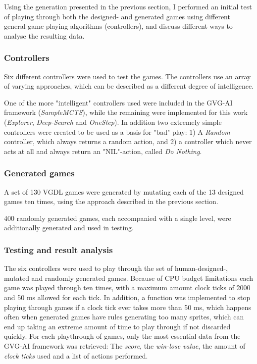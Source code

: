 \documentclass[a4paper,titlepage,final]{report}
\begin{document}
Using the generation presented in the previous section, I performed an initial test of playing through both the designed- and generated games using different general game playing algorithms (controllers), and discuss different ways to analyse the resulting data.


\subsubsection*{Controllers}
Six different controllers were used to test the games. 
The controllers use an array of varying approaches, which can be described as a different degree of intelligence. 

One of the more "intelligent" controllers used were included in the GVG-AI framework (\textit{SampleMCTS}), while the remaining were implemented for this work (\textit{Explorer}, \textit{Deep-Search} and \textit{OneStep}).
In addition two extremely simple controllers were created to be used as a basis for "bad" play:
1) A \textit{Random} controller, which always returns a random action, and 2) a controller which never acts at all and always return an "NIL"-action, called \textit{Do Nothing}.



\subsubsection*{Generated games}
A set of 130 VGDL games were generated by mutating each of the 13 designed games ten times, using the approach described in the previous section.

400 randomly generated games, each accompanied with a single level, were additionally generated and used in testing.

\subsubsection*{Testing and result analysis}
The six controllers were used to play through the set of human-designed-, mutated and randomly generated games. 
Because of CPU budget limitations each game was played through ten times, with a maximum amount clock ticks of 2000 and 50 ms allowed for each tick.
In addition, a function was implemented to stop playing through games if a clock tick ever takes more than 50 ms, which happens often when generated games have rules generating too many sprites, which can end up taking an extreme amount of time to play through if not discarded quickly.
For each playthrough of games, only the most essential data from the GVG-AI framework was retrieved: The \textit{score}, the \textit{win-lose value}, the amount of \textit{clock ticks} used and a list of actions performed.
\end{document}
